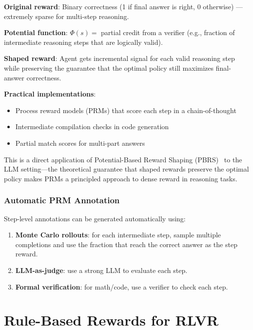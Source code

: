 \begin{examplebox}
\textbf{Original reward}: Binary correctness (1 if final answer is right, 0 otherwise) --- extremely sparse for multi-step reasoning.

\textbf{Potential function}: $\Phi(s) =$ partial credit from a verifier (e.g., fraction of intermediate reasoning steps that are logically valid).

\textbf{Shaped reward}: Agent gets incremental signal for each valid reasoning step while preserving the guarantee that the optimal policy still maximizes final-answer correctness.

\textbf{Practical implementations}:

\begin{itemize}
  \item Process reward models (PRMs) that score each step in a chain-of-thought
  \item Intermediate compilation checks in code generation
  \item Partial match scores for multi-part answers
\end{itemize}

This is a direct application of Potential-Based Reward Shaping (PBRS)~\cite{ng1999policy} to the LLM setting---the theoretical guarantee that shaped rewards preserve the optimal policy makes PRMs a principled approach to dense reward in reasoning tasks.
\end{examplebox}

\subsubsection*{Automatic PRM Annotation}
\label{automatic-prm-annotation}

Step-level annotations can be generated automatically using:

\begin{enumerate}
  \item \textbf{Monte Carlo rollouts}: for each intermediate step, sample multiple completions and use the fraction that reach the correct answer as the step reward.
  \item \textbf{LLM-as-judge}: use a strong LLM to evaluate each step.
  \item \textbf{Formal verification}: for math/code, use a verifier to check each step.
\end{enumerate}

\section{Rule-Based Rewards for RLVR}
\label{sec:rule-based-rewards}

